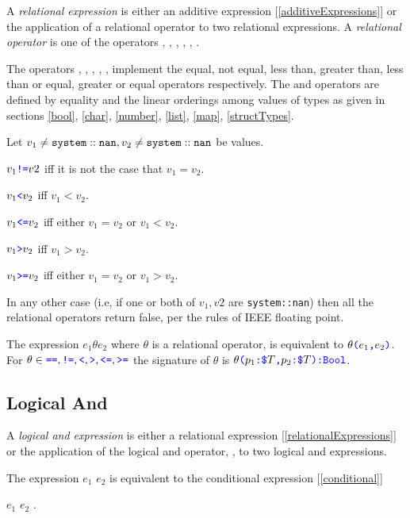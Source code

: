 \documentclass{article}
\begin{document}
{A {\em relational expression} is either an additive expression [\ref{additiveExpressions}] or the application of a relational operator to two relational expressions.
A {\em relational operator} is one of the operators \EQ{}, \NEQ{}, \LT{}, \GT{}, \LTE{}, \GTE{}.

The operators \EQ{}, \NEQ{}, \LT{}, \GT{}, \LTE{}, \GTE{} implement the equal, not equal,  less than, greater than,  less than or equal, greater or equal operators respectively. The \EQ{} and \LT{} operators are defined by equality and the linear orderings among values of types as given in sections \ref{bool}, \ref{char}, \ref{number}, \ref{list}, \ref{map}, \ref{structTypes}.

Let $v_1 \ne {\tt system::nan}, v_2 \ne {\tt system::nan}$ be values. 

$v_1 \texttt{\color{blue} !=}{} v2$ iff it is not the case that $v_1 = v_2$.

$v_1 \texttt{\color{blue} \tt<}{} v_2$ iff $v_1 < v_2$.

$v_1 \texttt{\color{blue} \tt<=}{} v_2$ iff either $v_1 = v_2$ or $v_1 < v_2$.

$v_1 \texttt{\color{blue} \tt>}{} v_2$ iff $v_1 > v_2$.

$v_1 \texttt{\color{blue} \tt>=}{} v_2$ iff either $v_1 = v_2$ or $v_1 > v_2$.

In any other case (i.e, if one or both of $v_1, v2$ are {\tt system::nan}) then all the relational operators return false, per the rules of IEEE floating point.

\RelExpression{}
\RelOp{}

The expression $e_1 \theta e_2$ where $\theta$ is a relational operator, is equivalent to $\theta\texttt{\color{blue} (}{}e_1\texttt{\color{blue} ,}{} e_2\texttt{\color{blue} )}$. For $\theta{} \in \texttt{\color{blue} ==}{}, \texttt{\color{blue} !=}{}, \texttt{\color{blue} \tt<}{}, \texttt{\color{blue} \tt>}{}, \texttt{\color{blue} \tt<=}{}, \texttt{\color{blue} \tt>=}{}$ the signature of $\theta$ is $\theta\texttt{\color{blue} (}{}p_1\texttt{\color{blue} :}{} \texttt{\color{blue} \$}{}T\texttt{\color{blue} ,}{} p_2\texttt{\color{blue} :}{} \texttt{\color{blue} \$}{}T\texttt{\color{blue} )}\texttt{\color{blue} :}{}\texttt{\color{blue} Bool}$.


\subsection{Logical And}
\label{logicalAnd}

A {\em logical and expression} is either a relational expression [\ref{relationalExpressions}] or the application of the logical and operator, \AND{}, to two logical and expressions.

\AndExpression{}

The expression $e_1$ \AND{} $e_2$ is equivalent to the conditional expression [\ref{conditional}] 

\IF{} $e_1$ \THEN{} $e_2$ \ELSE{} \FALSE{}.

}
\end{document}

